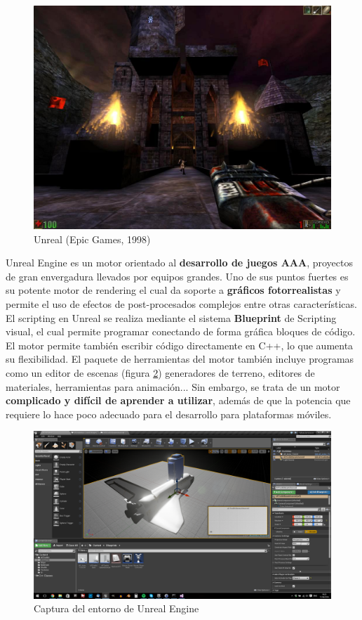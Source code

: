 \begin{figure}[!htb]
	\label{captura-unreal}
	\includegraphics[width=0.85\linewidth, right]{images/estadodelarte/motores/unreal-original}
    \caption{Unreal (Epic Games, 1998)}
	\centering
	\label{unreal-original}
\end{figure}

Unreal Engine es un motor orientado al \textbf{desarrollo de juegos AAA}, proyectos de gran envergadura llevados por equipos grandes. Uno de sus puntos fuertes es su potente motor de rendering el cual da soporte a \textbf{gráficos fotorrealistas} y permite el uso de efectos de post-procesados complejos entre otras características. El scripting en Unreal se realiza mediante el sistema \textbf{Blueprint} de Scripting visual, el cual permite programar conectando de forma gráfica bloques de código. El motor permite también escribir código directamente en C++, lo que aumenta su flexibilidad. El paquete de herramientas del motor también incluye programas como un editor de escenas (figura \ref{captura-unreal}) generadores de terreno, editores de materiales, herramientas para animación... Sin embargo, se trata de un motor \textbf{complicado y difícil de aprender a utilizar}, además de que la potencia que requiere lo hace poco adecuado para el desarrollo para plataformas móviles.

\begin{figure}[h]
	\label{captura-unreal}
	\includegraphics[width=1\textwidth]{images/estadodelarte/motores/captura-unreal}
	\centering
	\caption{Captura del entorno de Unreal Engine}
	\label{captura-unreal}
\end{figure}

